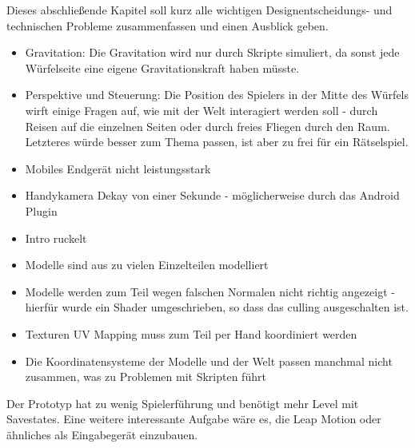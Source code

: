 
Dieses abschließende Kapitel soll kurz alle wichtigen Designentscheidungs- und technischen Probleme zusammenfassen und einen Ausblick geben. 

\begin{itemize}
\item Gravitation: Die Gravitation wird nur durch Skripte simuliert, da sonst jede Würfelseite eine eigene Gravitationskraft haben müsste.
\item Perspektive und Steuerung: Die Position des Spielers in der Mitte des Würfels wirft einige Fragen auf, wie mit der Welt interagiert werden soll - durch Reisen auf die einzelnen Seiten oder durch freies Fliegen durch den Raum. Letzteres würde besser zum Thema passen, ist aber zu frei für ein Rätselspiel.
\item Mobiles Endgerät nicht leistungsstark
\item Handykamera Dekay von einer Sekunde - möglicherweise durch das Android Plugin
\item Intro ruckelt
\item Modelle sind aus zu vielen Einzelteilen modelliert
\item Modelle werden zum Teil wegen falschen Normalen nicht richtig angezeigt - hierfür wurde ein Shader umgeschrieben, so dass das culling ausgeschalten ist.
\item Texturen UV Mapping muss zum Teil per Hand koordiniert werden
\item Die Koordinatensysteme der Modelle und der Welt passen manchmal nicht zusammen, was zu Problemen mit Skripten führt
\end{itemize}

Der Prototyp hat zu wenig Spielerführung und benötigt mehr Level mit Savestates. Eine weitere interessante Aufgabe wäre es, die Leap Motion oder ähnliches als Eingabegerät einzubauen.